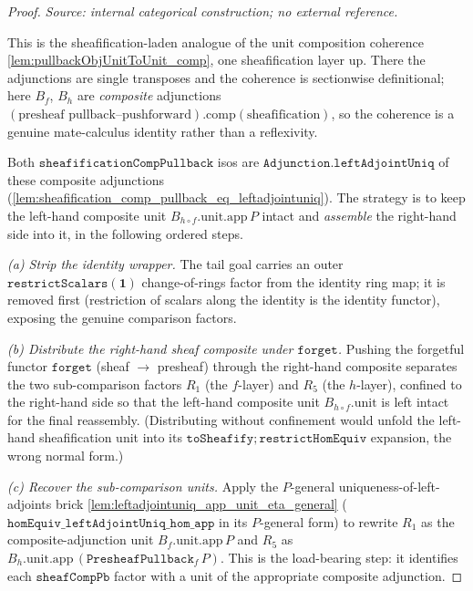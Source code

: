 \begin{proof}
  \textit{Source: internal categorical construction; no external reference.}

  This is the sheafification-laden analogue of the unit composition coherence
  \cref{lem:pullbackObjUnitToUnit_comp}, one sheafification layer up. There the adjunctions
  are single transposes and the coherence is sectionwise definitional; here \(B_f\), \(B_h\)
  are \emph{composite} adjunctions \((\text{presheaf pullback--pushforward})\mathbin{.\mathrm{comp}}
  (\text{sheafification})\), so the coherence is a genuine mate-calculus identity rather than a
  reflexivity.

  Both \(\mathtt{sheafificationCompPullback}\) isos are
  \(\mathtt{Adjunction.leftAdjointUniq}\) of these composite adjunctions
  (\cref{lem:sheafification_comp_pullback_eq_leftadjointuniq}). The strategy is to keep the
  left-hand composite unit \(B_{h \circ f}.\mathrm{unit}.\mathrm{app}\,P\) intact and
  \emph{assemble} the right-hand side into it, in the following ordered steps.

  \emph{(a) Strip the identity wrapper.} The tail goal carries an outer
  \(\mathtt{restrictScalars}(\mathbf{1})\) change-of-rings factor from the identity ring map;
  it is removed first (restriction of scalars along the identity is the identity functor),
  exposing the genuine comparison factors.

  \emph{(b) Distribute the right-hand sheaf composite under \(\mathtt{forget}\).} Pushing the
  forgetful functor \(\mathtt{forget}\) (sheaf \(\to\) presheaf) through the right-hand
  composite separates the two sub-comparison factors \(R_1\) (the \(f\)-layer) and \(R_5\)
  (the \(h\)-layer), confined to the right-hand side so that the left-hand composite unit
  \(B_{h \circ f}.\mathrm{unit}\) is left intact for the final reassembly. (Distributing
  without confinement would unfold the left-hand sheafification unit into its
  \(\mathtt{toSheafify} \mathbin{;} \mathtt{restrictHomEquiv}\) expansion, the wrong normal
  form.)

  \emph{(c) Recover the sub-comparison units.} Apply the \(P\)-general
  uniqueness-of-left-adjoints brick \cref{lem:leftadjointuniq_app_unit_eta_general}
  (\(\mathtt{homEquiv\_leftAdjointUniq\_hom\_app}\) in its \(P\)-general form) to rewrite
  \(R_1\) as the composite-adjunction unit \(B_f.\mathrm{unit}.\mathrm{app}\,P\) and \(R_5\)
  as \(B_h.\mathrm{unit}.\mathrm{app}\,(\mathtt{PresheafPullback}_f\,P)\). This is the
  load-bearing step: it identifies each \(\mathtt{sheafCompPb}\) factor with a unit of the
  appropriate composite adjunction.


\end{proof}
